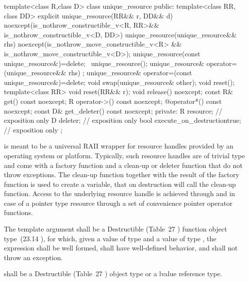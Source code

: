 \documentclass[ebook,11pt,article]{memoir}
\begin{document}
\begin{codeblock}
template<class R,class D>
class unique_resource {
public:
  template<class RR, class DD>
  explicit unique_resource(RR&& r, DD&& d)
    noexcept(is_nothrow_constructible_v<R, RR>&&
             is_nothrow_constructible_v<D, DD>)
  unique_resource(unique_resource&& rhs)
    noexcept(is_nothrow_move_constructible_v<R> &&
             is_nothrow_move_constructible_v<D>);
  unique_resource(const unique_resource&)=delete; 
  ~unique_resource();
  unique_resource& operator=(unique_resource&& rhs) ;
  unique_resource& operator=(const unique_resource&)=delete;
  void swap(unique_resource& other);
  void reset();
  template<class RR>
  void reset(RR&& r);
  void release() noexcept;
  const R& get() const noexcept;
  R operator->() const noexcept;
  @\seebelow@ operator*() const noexcept;
  const D& get_deleter() const noexcept;
private:
  R resource; // exposition only
  D deleter; // exposition only
  bool execute_on_destruction{true}; // exposition only
};
\end{codeblock}

\pnum
\begin{note}
 is meant to be a universal RAII wrapper for resource handles provided by an operating system or platform.
Typically, such resource handles are of trivial type and come with a factory function and a clean-up or deleter function that do not throw exceptions.
The clean-up function together with the result of the factory function is used to create a  variable, that on destruction will call the clean-up function. Access to the underlying resource handle is achieved through  and in case of a pointer type resource through a set of convenience pointer operator functions.
\end{note}


\pnum 
The template argument
 shall be a 
Destructible 
(Table~27
) function object type~(23.14
), 
for which, given
a value  of type  and a value
 of type , the expression
 shall be well formed, shall have well-defined behavior, and shall not throw an exception.

\pnum
{} shall be a
Destructible 
(Table~27
) object type 
or a lvalue reference type.
\end{document}

